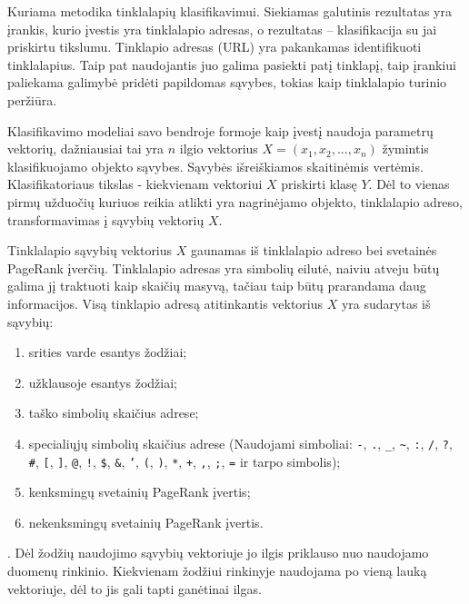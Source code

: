 Kuriama metodika tinklalapių klasifikavimui. Siekiamas galutinis rezultatas yra įrankis, kurio įvestis yra tinklalapio adresas, o rezultatas -- klasifikacija su jai priskirtu tikslumu. Tinklapio adresas (URL) yra pakankamas identifikuoti tinklalapius. Taip pat naudojantis juo galima pasiekti patį tinklapį, taip įrankiui paliekama galimybė pridėti papildomas sąvybes, tokias kaip tinklalapio turinio peržiūra.

Klasifikavimo modeliai savo bendroje formoje kaip įvestį naudoja parametrų vektorių, dažniausiai tai yra $n$ ilgio vektorius $X = (x_1, x_2, ... , x_n)$ žymintis klasifikuojamo objekto sąvybes. Sąvybės išreiškiamos skaitinėmis vertėmis. Klasifikatoriaus tikslas - kiekvienam vektoriui $X$ priskirti klasę $Y$. Dėl to vienas pirmų užduočių kuriuos reikia atlikti yra nagrinėjamo objekto, tinklalapio adreso, transformavimas į sąvybių vektorių $X$.


Tinklalapio sąvybių vektorius $X$ gaunamas iš tinklalapio adreso bei svetainės PageRank įverčių. Tinklalapio adresas yra simbolių eilutė, naiviu atveju būtų galima jį traktuoti kaip skaičių masyvą, tačiau taip būtų prarandama daug informacijos. Visą tinklapio adresą atitinkantis vektorius $X$ yra sudarytas iš sąvybių:
\begin{enumerate}
\item srities varde esantys žodžiai;
\item užklausoje esantys žodžiai;
\item taško simbolių skaičius adrese;
\item specialiųjų simbolių skaičius adrese (Naudojami simboliai:
\texttt{-},
\texttt{.},
\texttt{\_},
\texttt{\~},
\texttt{:},
\texttt{/},
\texttt{?},
\texttt{\#},
\texttt{[},
\texttt{]},
\texttt{@},
\texttt{!},
\texttt{\$},
\texttt{\&},
\texttt{'},
\texttt{(},
\texttt{)},
\texttt{*},
\texttt{+},
\texttt{,},
\texttt{;},
\texttt{=}
ir tarpo simbolis);
\item kenksmingų svetainių PageRank įvertis;
\item nekenksmingų svetainių PageRank įvertis.
\end{enumerate}.
Dėl žodžių naudojimo sąvybių vektoriuje jo ilgis priklauso nuo naudojamo duomenų rinkinio. Kiekvienam žodžiui rinkinyje naudojama po vieną lauką vektoriuje, dėl to jis gali tapti ganėtinai ilgas.



